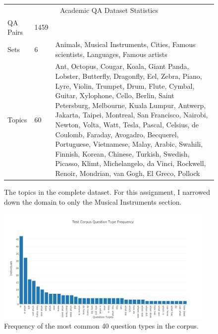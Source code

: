 \documentclass[twoside]{article}
\begin{document}

\begin{figure}
\caption{The topics in the complete dataset.  For this assignment, I narrowed down the domain to only the Musical Instruments section. \label{fig:datastat}}
\begin{tabular}{|l|l|p{11.5cm}|}
\hline
\multicolumn{3}{|c|}{Academic QA Dataset Statistics} \\
QA Pairs & 1459 & \\ \hline
Sets & 6 & {\color{applegreen}Animals}, {\color{azure}Musical Instruments}, {\color{auburn}Cities}, {\color{americanrose}Famous scientists}, {\color{orange}Languages}, {\color{black}Famous artists}\\ \hline
Topics & 60 & {\color{applegreen}Ant, Octopus, Cougar, Koala, Giant Panda, Lobster, Butterfly, Dragonfly, Eel, Zebra}, {\color{azure}Piano, Lyre, Violin, Trumpet, Drum, Flute, Cymbal, Guitar, Xylophone, Cello,} {\color{auburn}Berlin, Saint Petersburg, Melbourne, Kuala Lumpur, Antwerp, Jakarta, Taipei, Montreal, San Francisco, Nairobi,} {\color{americanrose}Newton, Volta, Watt, Tesla, Pascal, Celsius, de Coulomb, Faraday,  Avogadro, Becquerel}, {\color{orange}Portuguese, Vietnamese, Malay, Arabic, Swahili, Finnish, Korean, Chinese, Turkish, Swedish,} {\color{black}Picasso, Klimt, Michelangelo, da Vinci, Rockwell, Renoir, Mondrian, van Gogh, El Greco, Pollock} \\ \hline
\end{tabular}
\end{figure}

\begin{figure}
\centering
\caption{Frequency of the most common 40 question types in the corpus. \label{fig:qtypes}}
\includegraphics[width=400px]{figures/qtypes-test.png}
\end{figure}
\end{document}
